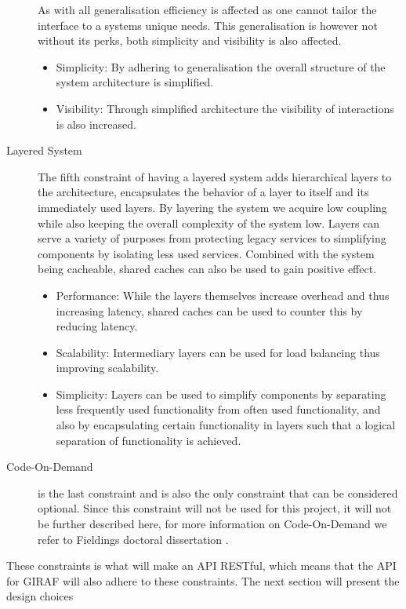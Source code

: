 \begin{description}
    As with all generalisation efficiency is affected as one cannot tailor the interface to a systems unique needs.
    This generalisation is however not without its perks, both simplicity and visibility is also affected.
    \begin{itemize}
        \item Simplicity: By adhering to generalisation the overall structure of the system architecture is simplified.
        \item Visibility: Through simplified architecture the visibility of interactions is also increased.
    \end{itemize}
    \item [Layered System] The fifth constraint of having a layered system adds hierarchical layers to the architecture, encapsulates the behavior of a layer to itself and its immediately used layers.
    By layering the system we acquire low coupling while also keeping the overall complexity of the system low.
    Layers can serve a variety of purposes from protecting legacy services to simplifying components by isolating less used services.
    Combined with the system being cacheable, shared caches can also be used to gain positive effect.
    \begin{itemize}
        \item Performance: While the layers themselves increase overhead and thus increasing latency, shared caches can be used to counter this by reducing latency.
        \item Scalability: Intermediary layers can be used for load balancing thus improving scalability.
        \item Simplicity: Layers can be used to simplify components by separating less frequently used functionality from often used functionality, and also by encapsulating certain functionality in layers such that a logical separation of functionality is achieved.
    \end{itemize} 
    \item [Code-On-Demand] is the last constraint and is also the only constraint that can be considered optional.
    Since this constraint will not be used for this project, it will not be further described here, for more information on Code-On-Demand we refer to Fieldings doctoral dissertation \citep{fielding2000rest}.
\end{description}

These constraints is what will make an API RESTful, which means that the API for GIRAF will also adhere to these constraints.
The next section will present the design choices 